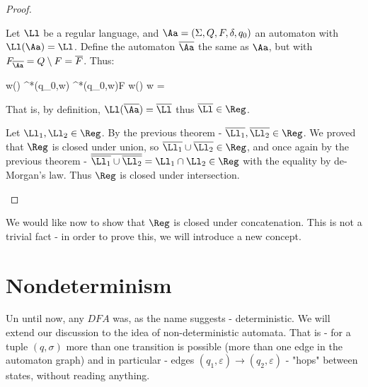 \begin{proof}
	\begin{mythrm}
		[Complementation:] Let $\Ll$ be a regular language, and $\Aa = \left(\Sigma, Q,F, \delta, q_0\right)$ an automaton with $\Ll(\Aa) = \Ll$. Define the automaton $\overline{\Aa}$ the same as $\Aa$, but with $F_{\overline{\Aa}} = Q\setminus F = \overline{F}$. Thus:
		\begin{flalign*}
			w\in \Ll(\overline{\Aa}) \iff \delta^*(q_0,w)\in {} \iff \delta^*(q_0,w)\notin F \iff w\notin \Ll(\Aa) \iff w\in \overline{\Ll(\Aa)} = \overline{\Ll}
		\end{flalign*}
		That is, by definition, $\Ll(\overline{\Aa}) = \overline{\Ll}$ thus $\overline{\Ll}\in \Reg$. 	
	\end{mythrm}
	\begin{mythrm}
		[Intersection:] Let $\Ll_1, \Ll_2\in \Reg$. By the previous theorem - $\overline{\Ll_1}, \overline{\Ll_2}\in \Reg$. We proved that $\Reg$ is closed under union, so $\overline{\Ll_1} \cup \overline{\Ll_2}\in \Reg$, and once again by the previous theorem - $\overline{\overline{\Ll_1} \cup \overline{\Ll_2}} = \Ll_1\cap \Ll_2\in \Reg$ with the equality by de-Morgan's law. Thus $\Reg$ is closed under intersection.
	\end{mythrm}
\end{proof}
We would like now to show that $\Reg$ is closed under concatenation. This is not a trivial fact - in order to prove this, we will introduce a new concept.
\section{Nondeterminism}
Un until now, any $DFA$ was, as the name suggests - deterministic. We will extend our discussion to the idea of non-deterministic automata. That is - for a tuple $(q,\sigma)$ more than one transition is possible (more than one edge in the automaton graph) and in particular - edges $(q_1,\varepsilon) \to (q_2, \varepsilon)$ - "hops" between states, without reading anything.
